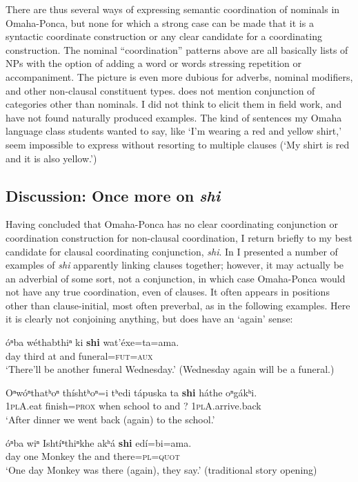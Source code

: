 \documentclass[output=paper]{LSP/langsci}
\begin{document}
There are thus several ways of expressing semantic coordination of nominals in Omaha-Ponca, but none for which a strong case can be made that it is a syntactic coordinate construction or any clear candidate for a coordinating construction. The nominal ``coordination'' patterns above are all basically lists of NPs with the option of adding a word or words stressing repetition or accompaniment. The picture is even more dubious for adverbs, nominal modifiers, and other non-clausal constituent types. \citet{Koontz1984} does not mention conjunction of categories other than nominals. I did not think to elicit them in field work, and have not found naturally produced examples.  The kind of sentences my Omaha language class students wanted to say, like `I'm wearing a red and yellow shirt,' seem impossible to express without resorting to multiple clauses (`My shirt is red and it is also yellow.')

\subsection{Discussion: Once more on \textit{shi}}

Having concluded that Omaha-Ponca has no clear coordinating conjunction or coordination construction for non-clausal coordination, I return briefly to my best candidate for clausal coordinating conjunction, \textit{shi}. In  I presented a number of examples of \textit{shi} apparently linking clauses together; however, it may actually be an adverbial of some sort, not a conjunction, in which case Omaha-Ponca would not have any true coordination, even of clauses. It often appears in positions other than clause-initial, most often preverbal, as in the following examples. Here it is clearly not conjoining anything, but does have an `again' sense:  

\begin{exe}	
\ex\label{ex:rudin:32}
\gll óⁿba 	wéthabthiⁿ 	ki 	\textbf{shi}  	wat'éxe=ta=ama.  \\
day  	third          	at 	and 	funeral=\textsc{fut=aux}  \\
\trans `There'll be another funeral Wednesday.'   (Wednesday again will be a funeral.)

\ex\label{ex:rudin:33} 
\gll Oⁿwóⁿthatʰoⁿ thíshtʰoⁿ=i 	tʰedi 	tápuska 	ta 	\textbf{shi}  háthe 	oⁿgákʰi. \\
\textsc{1plA}.eat  	finish=\textsc{prox} 	when 	school 	to 	and ?  	\textsc{1plA}.arrive.back \\
\trans `After dinner we went back (again) to the school.'

\ex\label{ex:rudin:34}
\gll óⁿba 	wiⁿ 	Ishtíⁿthiⁿkhe 	akʰá \textbf{shi} edí=bi=ama. \\
day	one 	Monkey 	the 	and 	there=\textsc{pl=quot} \\
\trans `One day Monkey was there (again), they say.'  (traditional story opening)
\end{exe}
\end{document}
